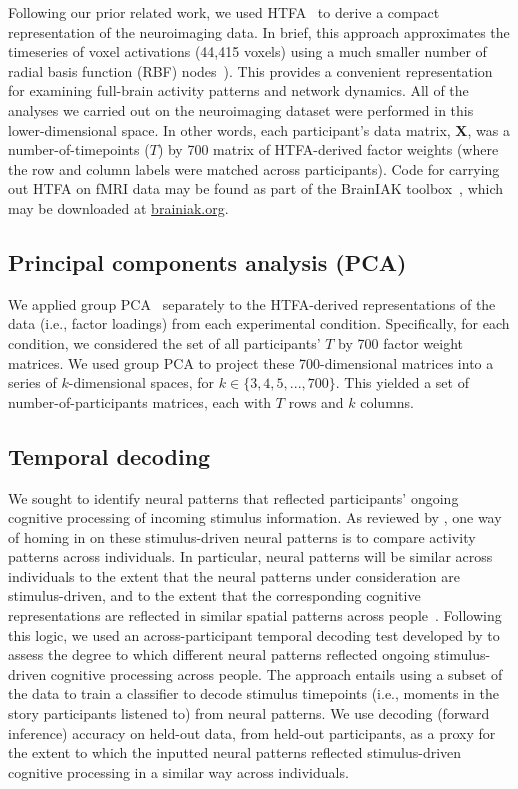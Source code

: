 \documentclass[english, 11pt]{article}
\begin{document}
Following our prior related work, we used HTFA~\cite{MannEtal18} to derive a
compact representation of the neuroimaging data. In brief, this approach
approximates the timeseries of voxel activations (44,415 voxels) using a much
smaller number of radial basis function (RBF) nodes~\citep[in this case, 700
nodes, as determined by an optimization procedure;][]{MannEtal18}). This
provides a convenient representation for examining full-brain activity patterns
and network dynamics. All of the analyses we carried out on the neuroimaging
dataset were performed in this lower-dimensional space. In other words, each
participant's data matrix, $\mathbf{X}$, was a number-of-timepoints ($T$) by 700
matrix of HTFA-derived factor weights (where the row and column labels were
matched across participants). Code for carrying out HTFA on fMRI data may be
found as part of the BrainIAK toolbox~\cite{CapoEtal17, KumaEtal21}, which may
be downloaded at \href{https://brainiak.org/}{brainiak.org}.

\subsection*{Principal components analysis (PCA)}

We applied group PCA~\citep{SmitEtal14} separately to the HTFA-derived
representations of the data (i.e., factor loadings) from each experimental
condition. Specifically, for each condition, we considered the set of all
participants' $T$ by 700 factor weight matrices. We used group PCA to project
these 700-dimensional matrices into a series of $k$-dimensional spaces, for $k
\in \{3, 4, 5, ..., 700\}$. This yielded a set of number-of-participants
matrices, each with $T$ rows and $k$ columns.

\subsection*{Temporal decoding}

We sought to identify neural patterns that reflected participants' ongoing
cognitive processing of incoming stimulus information. As reviewed by
\cite{SimoEtal16}, one way of homing in on these stimulus-driven neural
patterns is to compare activity patterns across individuals. In particular,
neural patterns will be similar across individuals to the extent that the
neural patterns under consideration are stimulus-driven, and to the extent that
the corresponding cognitive representations are reflected in similar spatial
patterns across people~\cite{SimoChan20}. Following this logic, we used an
across-participant temporal decoding test developed by \cite{MannEtal18} to
assess the degree to which different neural patterns reflected ongoing
stimulus-driven cognitive processing across people. The approach entails using
a subset of the data to train a classifier to decode stimulus timepoints (i.e.,
moments in the story participants listened to) from neural patterns. We use
decoding (forward inference) accuracy on held-out data, from held-out
participants, as a proxy for the extent to which the inputted neural patterns
reflected stimulus-driven cognitive processing in a similar way across
individuals.
\end{document}
